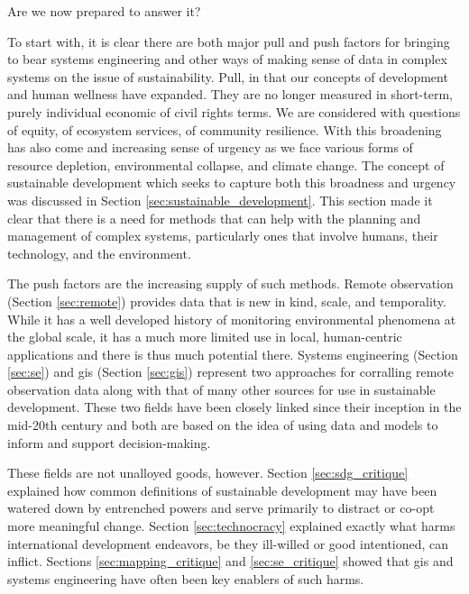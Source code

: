 Are we now prepared to answer it?

To start with, it is clear there are both major pull and push factors for bringing to bear systems engineering and other ways of making sense of data in complex systems on the issue of sustainability. Pull, in that our concepts of development and human wellness have expanded. They are no longer measured in short-term, purely individual economic of civil rights terms. We are considered with questions of equity, of ecosystem services, of community resilience. With this broadening has also come and increasing sense of urgency as we face various forms of resource depletion, environmental collapse, and climate change. The concept of sustainable development which seeks to capture both this broadness and urgency was discussed in Section \ref{sec:sustainable_development}. This section made it clear that there is a need for methods that can help with the planning and management of complex systems, particularly ones that involve humans, their technology, and the environment. 

The push factors are the increasing supply of such methods. Remote observation (Section \ref{sec:remote}) provides data that is new in kind, scale, and temporality. While it has a well developed history of monitoring environmental phenomena at the global scale, it has a much more limited use in local, human-centric applications and there is thus much potential there. Systems engineering (Section \ref{sec:se}) and \ac{gis} (Section \ref{sec:gis}) represent two approaches for corralling remote observation data along with that of many other sources for use in sustainable development. These two fields have been closely linked since their inception in the mid-20th century and both are based on the idea of using data and models to inform and support decision-making.

These fields are not unalloyed goods, however. Section \ref{sec:sdg_critique} explained how common definitions of sustainable development may have been watered down by entrenched powers and serve primarily to distract or co-opt more meaningful change. Section \ref{sec:technocracy} explained exactly what harms international development endeavors, be they ill-willed or good intentioned, can inflict. Sections \ref{sec:mapping_critique} and \ref{sec:se_critique} showed that \ac{gis} and systems engineering have often been key enablers of such harms.

